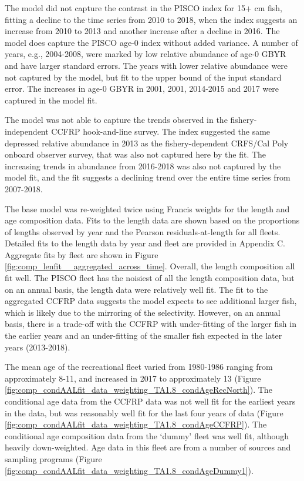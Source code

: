 \documentclass[12pt,]{article}
\begin{document}
The model did not capture the contrast in the PISCO index for 15+ cm
fish, fitting a decline to the time series from 2010 to 2018, when the
index suggests an increase from 2010 to 2013 and another increase after
a decline in 2016. The model does capture the PISCO age-0 index without
added variance. A number of years, e.g., 2004-2008, were marked by low
relative abundance of age-0 GBYR and have larger standard errors. The
years with lower relative abundance were not captured by the model, but
fit to the upper bound of the input standard error. The increases in
age-0 GBYR in 2001, 2001, 2014-2015 and 2017 were captured in the model
fit.

The model was not able to capture the trends observed in the
fishery-independent CCFRP hook-and-line survey. The index suggested the
same depressed relative abundance in 2013 as the fishery-dependent
CRFS/Cal Poly onboard observer survey, that was also not captured here
by the fit. The increasing trends in abundance from 2016-2018 was also
not captured by the model fit, and the fit suggests a declining trend
over the entire time series from 2007-2018.

The base model was re-weighted twice using Francis weights for the
length and age composition data. Fits to the length data are shown based
on the proportions of lengths observed by year and the Pearson
residuals-at-length for all fleets. Detailed fits to the length data by
year and fleet are provided in Appendix C. Aggregate fits by fleet are
shown in Figure \ref{fig:comp_lenfit__aggregated_across_time}. Overall,
the length composition all fit well. The PISCO fleet has the noisiest of
all the length composition data, but on an annual basis, the length data
were relatively well fit. The fit to the aggregated CCFRP data suggests
the model expects to see additional larger fish, which is likely due to
the mirroring of the selectivity. However, on an annual basis, there is
a trade-off with the CCFRP with under-fitting of the larger fish in the
earlier years and an under-fitting of the smaller fish expected in the
later years (2013-2018).

The mean age of the recreational fleet varied from 1980-1986 ranging
from approximately 8-11, and increased in 2017 to approximately 13
(Figure \ref{fig:comp_condAALfit_data_weighting_TA1.8_condAgeRecNorth}).
The conditional age data from the CCFRP data was not well fit for the
earliest years in the data, but was reasonably well fit for the last
four years of data (Figure
\ref{fig:comp_condAALfit_data_weighting_TA1.8_condAgeCCFRP}). The
conditional age composition data from the `dummy' fleet was well fit,
although heavily down-weighted. Age data in this fleet are from a number
of sources and sampling programs (Figure
\ref{fig:comp_condAALfit_data_weighting_TA1.8_condAgeDummy1}).
\end{document}
